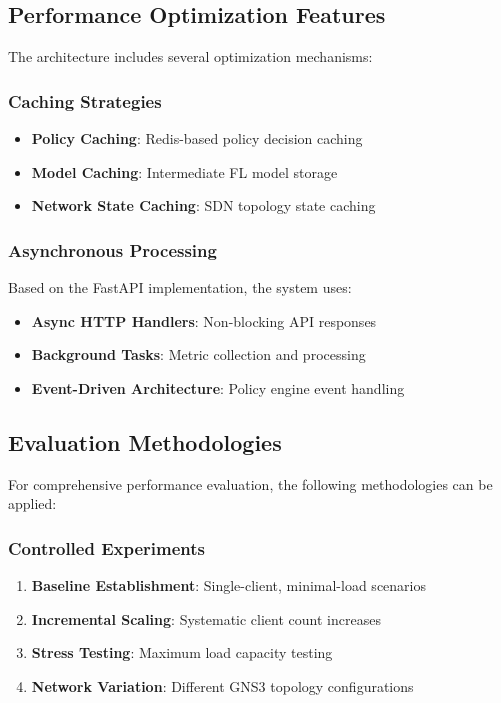\subsection{Performance Optimization Features}

The architecture includes several optimization mechanisms:

\subsubsection{Caching Strategies}
\begin{itemize}
    \item \textbf{Policy Caching}: Redis-based policy decision caching
    \item \textbf{Model Caching}: Intermediate FL model storage
    \item \textbf{Network State Caching}: SDN topology state caching
\end{itemize}

\subsubsection{Asynchronous Processing}
Based on the FastAPI implementation, the system uses:
\begin{itemize}
    \item \textbf{Async HTTP Handlers}: Non-blocking API responses
    \item \textbf{Background Tasks}: Metric collection and processing
    \item \textbf{Event-Driven Architecture}: Policy engine event handling
\end{itemize}

\subsection{Evaluation Methodologies}

For comprehensive performance evaluation, the following methodologies can be applied:

\subsubsection{Controlled Experiments}
\begin{enumerate}
    \item \textbf{Baseline Establishment}: Single-client, minimal-load scenarios
    \item \textbf{Incremental Scaling}: Systematic client count increases
    \item \textbf{Stress Testing}: Maximum load capacity testing
    \item \textbf{Network Variation}: Different GNS3 topology configurations
\end{enumerate}

